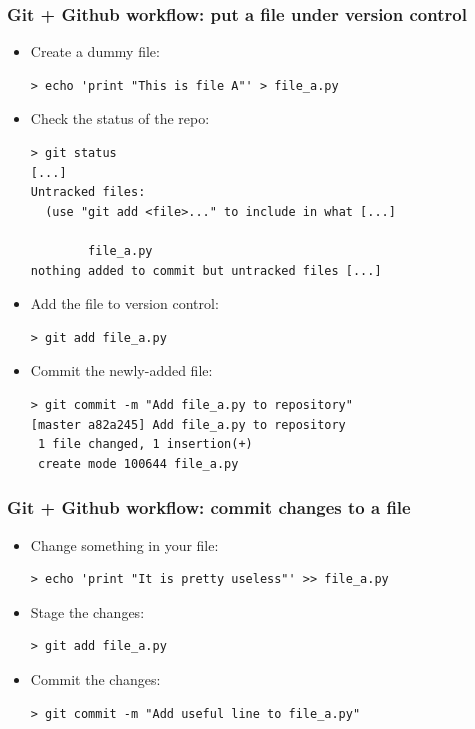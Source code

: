 \documentclass[mathserif, xcolor=dvipsnames]{beamer}
\begin{document}
\begin{frame}[fragile]
    \frametitle{Git + Github workflow: put a file under version control}
    \begin{itemize}
        \item{Create a dummy file:
\begin{lstlisting}
> echo 'print "This is file A"' > file_a.py
\end{lstlisting}}
    \item{Check the status of the repo:
\begin{lstlisting}
> git status
[...]
Untracked files:
  (use "git add <file>..." to include in what [...]

        file_a.py
nothing added to commit but untracked files [...]
\end{lstlisting}}
        \item{Add the file to version control:
\begin{lstlisting}
> git add file_a.py
\end{lstlisting}}
        \item{Commit the newly-added file:
\begin{lstlisting}
> git commit -m "Add file_a.py to repository"
[master a82a245] Add file_a.py to repository
 1 file changed, 1 insertion(+)
 create mode 100644 file_a.py
\end{lstlisting}}
    \end{itemize}
\end{frame}

\begin{frame}[fragile]
    \frametitle{Git + Github workflow: commit changes to a file}
    \begin{itemize}
        \item{Change something in your file:
\begin{lstlisting}
> echo 'print "It is pretty useless"' >> file_a.py
\end{lstlisting}}
        \item{Stage the changes:
\begin{lstlisting}
> git add file_a.py
\end{lstlisting}}
        \item{Commit the changes:
\begin{lstlisting}
> git commit -m "Add useful line to file_a.py"
\end{lstlisting}}
    \end{itemize}
\end{frame}
\end{document}

